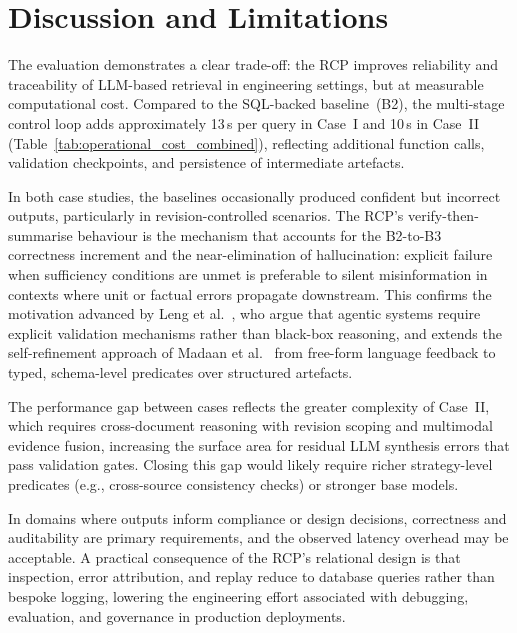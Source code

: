\documentclass[largeformat]{interact}
\begin{document}
\section{Discussion and Limitations}
\label{sec:Discussion}
The evaluation demonstrates a clear trade-off: the RCP improves reliability and traceability of LLM-based retrieval in engineering settings, but at measurable computational cost. Compared to the SQL-backed baseline~(B2), the multi-stage control loop adds approximately 13\,s per query in Case~I and 10\,s in Case~II (Table~\ref{tab:operational_cost_combined}), reflecting additional function calls, validation checkpoints, and persistence of intermediate artefacts.
 
In both case studies, the baselines occasionally produced confident but incorrect outputs, particularly in revision-controlled scenarios. The RCP's verify-then-summarise behaviour is the mechanism that accounts for the B2-to-B3 correctness increment and the near-elimination of hallucination: explicit failure when sufficiency conditions are unmet is preferable to silent misinformation in contexts where unit or factual errors propagate downstream. This confirms the motivation advanced by Leng et al.~\cite{leng2026}, who argue that agentic systems require explicit validation mechanisms rather than black-box reasoning, and extends the self-refinement approach of Madaan et al.~\cite{madaan2023selfrefine} from free-form language feedback to typed, schema-level predicates over structured artefacts.
 
The performance gap between cases reflects the greater complexity of Case~II, which requires cross-document reasoning with revision scoping and multimodal evidence fusion, increasing the surface area for residual LLM synthesis errors that pass validation gates. Closing this gap would likely require richer strategy-level predicates (e.g., cross-source consistency checks) or stronger base models.

In domains where outputs inform compliance or design decisions, correctness and auditability are primary requirements, and the observed latency overhead may be acceptable. A practical consequence of the RCP's relational design is that inspection, error attribution, and replay reduce to database queries rather than bespoke logging, lowering the engineering effort associated with debugging, evaluation, and governance in production deployments.
 
\end{document}
